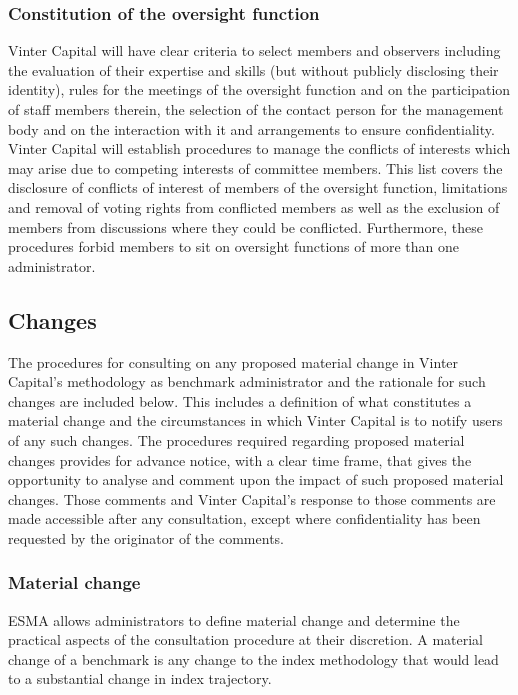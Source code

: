 \documentclass{article}
\begin{document}
\subsubsection{Constitution of the oversight function}
Vinter Capital will have clear criteria to select members and observers including the evaluation of their expertise and skills (but without publicly disclosing their identity), rules for the meetings of the oversight function and on the participation of staff members therein, the selection of the contact person for the management body and on the interaction with it and arrangements to ensure confidentiality. Vinter Capital will establish procedures to manage the conflicts of interests which may arise due to competing interests of committee members. This list covers the disclosure of conflicts of interest of members of the oversight function, limitations and removal of voting rights from conflicted members as well as the exclusion of members from discussions where they could be conflicted. Furthermore, these procedures forbid members to sit on oversight functions of more than one administrator.

\subsection{Changes}
The procedures for consulting on any proposed material change in Vinter Capital’s methodology as benchmark administrator and the rationale for such changes are included below. This includes a definition of what constitutes a material change and the circumstances in which Vinter Capital is to notify users of any such changes. The procedures required regarding proposed material changes provides for advance notice, with a clear time frame, that gives the opportunity to analyse and comment upon the impact of such proposed material changes. Those comments and Vinter Capital’s response to those comments are made accessible after any consultation, except where confidentiality has been requested by the originator of the comments. 

\subsubsection{Material change}
ESMA allows administrators to define material change and determine the practical aspects of the consultation procedure at their discretion. A material change of a benchmark is any change to the index methodology that would lead to a substantial change in index trajectory. 
\end{document}
